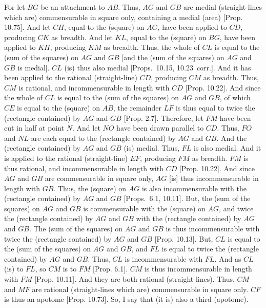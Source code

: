 \begin{Parallel}{}{}
{For let $BG$ be an attachment to $AB$. Thus, $AG$ and $GB$ are medial
(straight-lines which are) commensurable in square only, containing
a medial (area) [Prop. 10.75]. And let $CH$,
equal to the (square) on $AG$, have been applied to $CD$, producing
$CK$ as breadth. And let $KL$, equal to the (square) on $BG$, have
been applied to $KH$, producing $KM$ as breadth. Thus, the whole
of $CL$ is equal to the (sum of the squares) on $AG$ and $GB$ [and
the (sum of the squares) on $AG$ and $GB$ is medial]. $CL$ (is) thus
also medial [Props.~10.15, 10.23~corr.]. And it has been applied to the rational (straight-line)
$CD$, producing $CM$ as breadth. Thus, $CM$ is rational, and
incommensurable in length with $CD$ [Prop. 10.22]. And since the whole of $CL$ is equal
to the (sum of the squares) on $AG$ and $GB$, of which $CE$ is
equal to the (square) on $AB$, the remainder $LF$ is thus equal to
twice the (rectangle contained) by $AG$ and $GB$ [Prop. 2.7]. Therefore, let $FM$ have been
cut in half at point $N$. And let $NO$ have been drawn parallel to $CD$.
Thus, $FO$ and $NL$ are each equal to the (rectangle contained) by
$AG$ and $GB$. And the (rectangle contained) by $AG$ and $GB$ (is)
medial. Thus, $FL$ is also medial. And it is applied to the
rational (straight-line) $EF$, producing $FM$ as breadth.
$FM$ is thus rational, and incommensurable in length with $CD$ [Prop. 10.22]. And since $AG$ and $GB$
are commensurable in square only, $AG$ [is] thus incommensurable
in length with $GB$. Thus, the (square) on $AG$ is also incommensurable
with the (rectangle contained) by $AG$ and $GB$
[Props.~6.1, 10.11]. But,  the (sum of the squares) on $AG$
and $GB$ is commensurable with the (square) on $AG$, and twice the
(rectangle contained) by $AG$ and $GB$ with the (rectangle contained)
by $AG$ and $GB$. The (sum of the squares) on $AG$ and $GB$
is thus incommensurable with twice the (rectangle contained)
by $AG$ and $GB$ [Prop. 10.13]. But,
$CL$ is equal to the (sum of the squares) on $AG$ and $GB$, 
and $FL$ is equal to twice the (rectangle contained) by $AG$ and $GB$. Thus,
$CL$ is incommensurable with $FL$. And as $CL$ (is) to $FL$, so
$CM$ is to $FM$ [Prop. 6.1].  $CM$ is thus
incommensurable in length with $FM$ [Prop. 10.11]. And they are both rational (straight-lines). Thus, $CM$ and $MF$ are rational (straight-lines which are)
commensurable in square only. $CF$ is thus an apotome [Prop. 10.73]. So, I say that (it is) also a
third (apotome).

}
\end{Parallel}
